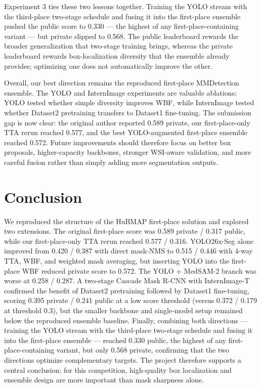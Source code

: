 \documentclass[12pt, a4paper]{article}
\begin{document}
Experiment 3 ties these two lessons together. Training the YOLO stream with the third-place two-stage schedule and fusing it into the first-place ensemble pushed the public score to 0.330 --- the highest of any first-place-containing variant --- but private slipped to 0.568. The public leaderboard rewards the broader generalization that two-stage training brings, whereas the private leaderboard rewards box-localization diversity that the ensemble already provides; optimizing one does not automatically improve the other.

Overall, our best direction remains the reproduced first-place MMDetection ensemble. The YOLO and InternImage experiments are valuable ablations: YOLO tested whether simple diversity improves WBF, while InternImage tested whether Dataset2 pretraining transfers to Dataset1 fine-tuning. The submission gap is now clear: the original author reported 0.589 private, our first-place-only TTA rerun reached 0.577, and the best YOLO-augmented first-place ensemble reached 0.572. Future improvements should therefore focus on better box proposals, higher-capacity backbones, stronger WSI-aware validation, and more careful fusion rather than simply adding more segmentation outputs.

\section{Conclusion}
\label{sec:conclusion}

We reproduced the structure of the HuBMAP first-place solution and explored two extensions. The original first-place score was 0.589 private / 0.317 public, while our first-place-only TTA rerun reached 0.577 / 0.316. YOLO26x-Seg alone improved from 0.420 / 0.387 with direct mask-NMS to 0.515 / 0.446 with 4-way TTA, WBF, and weighted mask averaging, but inserting YOLO into the first-place WBF reduced private score to 0.572. The YOLO + MedSAM-2 branch was worse at 0.258 / 0.287. A two-stage Cascade Mask R-CNN with InternImage-T confirmed the benefit of Dataset2 pretraining followed by Dataset1 fine-tuning, scoring 0.395 private / 0.241 public at a low score threshold (versus 0.372 / 0.179 at threshold 0.3), but the smaller backbone and single-model setup remained below the reproduced ensemble baseline. Finally, combining both directions --- training the YOLO stream with the third-place two-stage schedule and fusing it into the first-place ensemble --- reached 0.330 public, the highest of any first-place-containing variant, but only 0.568 private, confirming that the two directions optimize complementary targets. The project therefore supports a central conclusion: for this competition, high-quality box localization and ensemble design are more important than mask sharpness alone.




\endgroup
\end{document}
